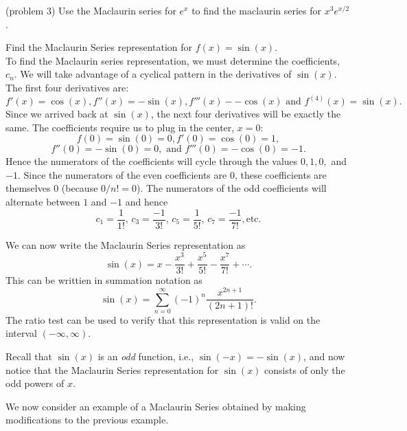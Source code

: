 \documentclass{ximera}
\begin{document}
\begin{problem}(problem 3)
Use the Maclaurin series for $e^x$ to find the maclaurin series for $x^3e^{x/2}$.
\begin{multipleChoice}
\end{multipleChoice}
\end{problem}



\begin{example} 
Find the Maclaurin Series representation for $f(x) = \sin(x)$.\\
To find the Maclaurin series representation, we must determine the coefficients, $c_n$. 
We will take advantage of a cyclical pattern in the derivatives of $\sin(x)$.
The first four derivatives are:
\[
f'(x) = \cos(x), f''(x) = -\sin(x), f'''(x) - -\cos(x) \text{ and } f^{(4)}(x) = \sin(x).
\]
Since we arrived back at $\sin(x)$, the next four derivatives will be exactly the same.
The coefficients require us to plug in the center, $x = 0$:
\[
f(0) = \sin(0) = 0, f'(0) = \cos(0) = 1,
\]
\[
 f''(0) = -\sin(0) = 0, \text{ and } f'''(0) = -\cos(0) = -1.
\]
Hence the numerators of the coefficients will cycle through the values $0, 1, 0,$ and $-1$.
Since the numerators of the even coefficients are 0, these coefficients are themselves 0 (because $0/n! = 0$).
The numerators of the odd coefficients will alternate between $1$ and $-1$ and hence 
\[
c_1 = \frac{1}{1!},\, c_3 = \frac{-1}{3!},\, c_5 = \frac{1}{5!}, \, c_7 = \frac{-1}{7!}, \text{etc}.
\]

We can now write the Maclaurin Series representation as
\[
\sin(x) =  x - \frac{x^3}{3!} + \frac{x^5}{5!} - \frac{x^7}{7!} + \cdots.
\]
This can be writtien in summation notation as
\[
\sin(x) = \sum_{n=0}^\infty (-1)^n\frac{x^{2n+1}}{(2n+1)!}.
\]
The ratio test can be used to verify that this representation is valid on the interval $(-\infty, \infty)$.
\begin{remark}
Recall that $\sin(x)$ is an \textit{odd} function, 
i.e., $\sin(-x) = -\sin(x)$, and now notice that the Maclaurin Series representation for $\sin(x)$ consists of only the 
odd powers of $x$. 
\end{remark}
\end{example}


We now consider an example of a Maclaurin Series obtained by making modifications to the previous example.
\end{document}
